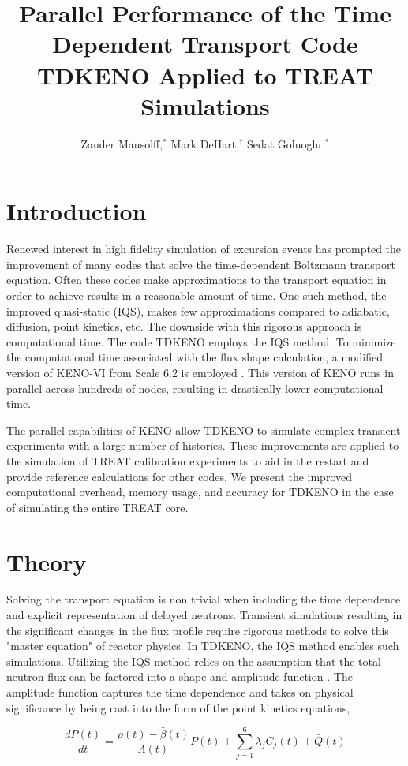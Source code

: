 \documentclass{anstrans}
\title{Parallel Performance of the Time Dependent Transport Code TDKENO Applied to TREAT Simulations}
\author{Zander Mausolff,$^{*}$ Mark DeHart,$^{\dagger}$ Sedat Goluoglu $^{*}$}
\institute{
$^{*}$Nuclear Engineering Program, University of Florida
\\
529 Gale Lemerand Dr., Gainesville, FL, 32611
\and
$^{\dagger}$Nuclear Systems Design and Analysis Department Idaho National Laboratory 
\\
2525 North Freemont Street, Idaho Falls ID, 83415
}
\begin{document}
\section{Introduction}
Renewed interest in high fidelity simulation of excursion events has prompted the improvement of many codes that solve the time-dependent Boltzmann transport equation. Often these codes make approximations to the transport equation in order to achieve results in a reasonable amount of time.  One such method, the improved quasi-static (IQS), makes few approximations compared to adiabatic, diffusion, point kinetics, etc. The downside with this rigorous approach is computational time.  The code TDKENO employs the IQS method. To minimize the computational time associated with the flux shape calculation, a modified version of KENO-VI from Scale 6.2 is employed \cite{rearden2013overview}. This version of KENO runs in parallel across hundreds of nodes, resulting in drastically lower computational time.

The parallel capabilities of KENO allow TDKENO to simulate complex transient experiments with a large number of histories. These improvements are applied to the simulation of TREAT calibration experiments to aid in the restart and provide reference calculations for other codes. We present the improved computational overhead, memory usage, and accuracy for TDKENO in the case of simulating the entire TREAT core. 

\section{Theory}
Solving the transport equation is non trivial when including the time dependence and explicit representation of delayed neutrons. Transient simulations resulting in the significant changes in the flux profile require rigorous methods to solve this "master equation" of reactor physics.  In TDKENO, the IQS method enables such simulations.  Utilizing the IQS method relies on the assumption that the total neutron flux can be factored into a shape and amplitude function \cite{Henry} \cite{Gehin}.  The amplitude function captures the time dependence and takes on physical significance by being cast into the form of the point kinetics equations,

\begin{equation}
    \frac{dP(t)}{dt} = \frac{\rho(t)-\bar{\beta}(t)}{\Lambda(t)} P(t) + \sum_{j=1}^{6} \lambda_jC_j(t) + \bar{Q}(t)
\end{equation}
\end{document}
